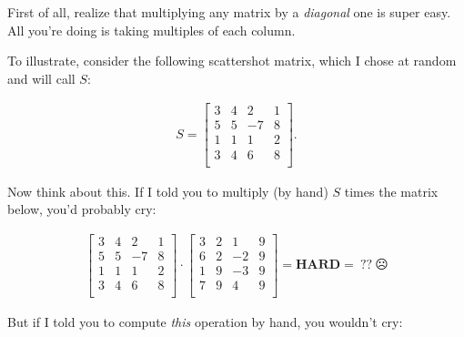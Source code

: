 First of all, realize that multiplying any matrix by a \textit{diagonal} one is
super easy. All you're doing is taking multiples of each column.

\pagebreak


To illustrate, consider the following scattershot matrix, which I chose at
random and will call $S$:

\vspace{-.15in}
\begin{align*}
S = \begin{bmatrix}
3 & 4 & 2 & 1 \\
5 & 5 & -7 & 8 \\
1 & 1 & 1 & 2 \\
3 & 4 & 6 & 8 \\
\end{bmatrix}.
\end{align*}
\vspace{-.15in}

Now think about this. If I told you to multiply (by hand) $S$ times the matrix
below, you'd probably cry:

\vspace{-.15in}
\begin{align*}
\begin{bmatrix}
3 & 4 & 2 & 1 \\
5 & 5 & -7 & 8 \\
1 & 1 & 1 & 2 \\
3 & 4 & 6 & 8 \\
\end{bmatrix} \cdot
\begin{bmatrix}
3 & 2 & 1 & 9 \\
6 & 2 & -2 & 9 \\
1 & 9 & -3 & 9 \\
7 & 9 & 4 & 9 \\
\end{bmatrix} = \textbf{HARD} = \ ?? \ \frownie{}
\end{align*}
\vspace{-.05in}

But if I told you to compute \textit{this} operation by hand, you wouldn't cry:

